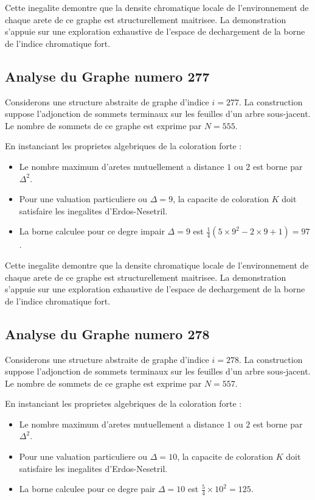 \documentclass[11pt,a4paper]{article}
\begin{document}
Cette inegalite demontre que la densite chromatique locale de l'environnement de chaque arete de ce graphe est structurellement maitrisee. La demonstration s'appuie sur une exploration exhaustive de l'espace de dechargement de la borne de l'indice chromatique fort.

\subsection{Analyse du Graphe numero 277}
Considerons une structure abstraite de graphe d'indice $i = 277$. La construction suppose l'adjonction de sommets terminaux sur les feuilles d'un arbre sous-jacent. Le nombre de sommets de ce graphe est exprime par $N = 555$.

En instanciant les proprietes algebriques de la coloration forte :
\begin{itemize}
\item Le nombre maximum d'aretes mutuellement a distance $1$ ou $2$ est borne par $\Delta^2$.
\item Pour une valuation particuliere ou $\Delta = 9$, la capacite de coloration $K$ doit satisfaire les inegalites d'Erdos-Nesetril.
\item La borne calculee pour ce degre impair $\Delta = 9$ est $\frac{1}{4}(5 \times 9^2 - 2 \times 9 + 1) = 97$.
\end{itemize}

Cette inegalite demontre que la densite chromatique locale de l'environnement de chaque arete de ce graphe est structurellement maitrisee. La demonstration s'appuie sur une exploration exhaustive de l'espace de dechargement de la borne de l'indice chromatique fort.

\subsection{Analyse du Graphe numero 278}
Considerons une structure abstraite de graphe d'indice $i = 278$. La construction suppose l'adjonction de sommets terminaux sur les feuilles d'un arbre sous-jacent. Le nombre de sommets de ce graphe est exprime par $N = 557$.

En instanciant les proprietes algebriques de la coloration forte :
\begin{itemize}
\item Le nombre maximum d'aretes mutuellement a distance $1$ ou $2$ est borne par $\Delta^2$.
\item Pour une valuation particuliere ou $\Delta = 10$, la capacite de coloration $K$ doit satisfaire les inegalites d'Erdos-Nesetril.
\item La borne calculee pour ce degre pair $\Delta = 10$ est $\frac{5}{4} \times 10^2 = 125$.
\end{itemize}
\end{document}
